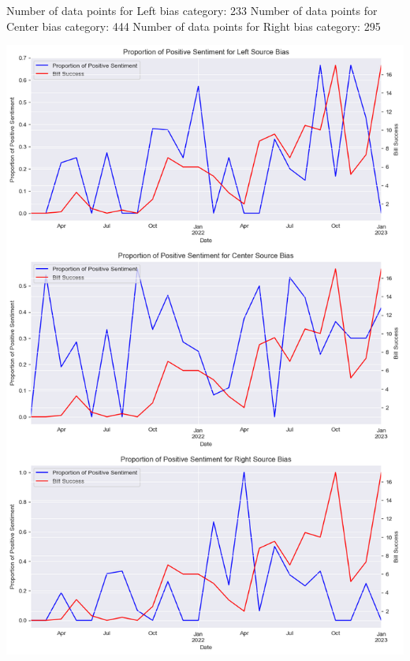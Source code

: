 \begin{pyprint}
Number of data points for Left bias category: 233
Number of data points for Center bias category: 444
Number of data points for Right bias category: 295
\end{pyprint}

\includegraphics[width=\textwidth]{./figs/fig_10.png}
